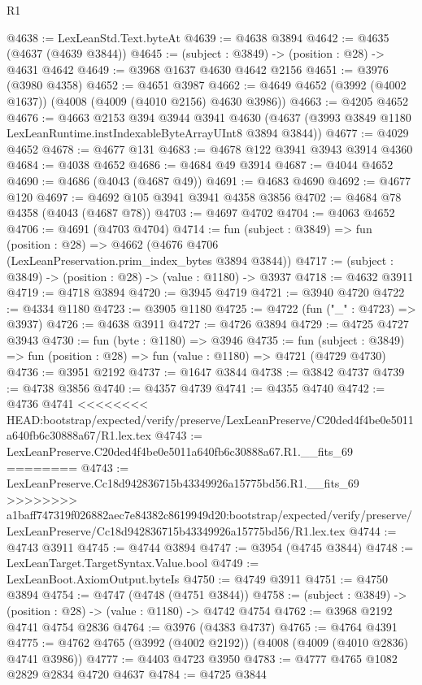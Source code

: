 \begin{lexlean}{R1}
\begin{coremodule}
{{{{{{{{{{{{{{{{{{{{{{{{{{{{{{{{{{{{{{{{{{{{{{{{{{{{{{{{{{{{{{{{{{{{{{{{{{{{{{{{{{{{{{{{{{{{{{{{{{{{{{{{{{{{{{{{{{{{{{{{{{{{{{{{{{{{{{{{{{{{{{{{{{{{{{{{{{{{{{{{{{{{{{{{{{{{{{{{{{{{{{{{{{@4638 := LexLeanStd.Text.byteAt
@4639 := @4638 @3894
@4642 := @4635 (@4637 (@4639 @3844))
@4645 := (subject : @3849) -> (position : @28) -> @4631 @4642
@4649 := @3968 @1637 @4630 @4642 @2156
@4651 := @3976 (@3980 @4358)
@4652 := @4651 @3987
@4662 := @4649 @4652 (@3992 (@4002 @1637)) (@4008 (@4009 (@4010 @2156) @4630 @3986))
@4663 := @4205 @4652
@4676 := @4663
    @2153
    @394
    @3944
    @3941
    @4630
    (@4637 (@3993 @3849 @1180 LexLeanRuntime.instIndexableByteArrayUInt8 @3894 @3844))
@4677 := @4029 @4652
@4678 := @4677 @131
@4683 := @4678 @122 @3941 @3943 @3914 @4360
@4684 := @4038 @4652
@4686 := @4684 @49 @3914
@4687 := @4044 @4652
@4690 := @4686 (@4043 (@4687 @49))
@4691 := @4683 @4690
@4692 := @4677 @120
@4697 := @4692 @105 @3941 @3941 @4358 @3856
@4702 := @4684 @78 @4358 (@4043 (@4687 @78))
@4703 := @4697 @4702
@4704 := @4063 @4652
@4706 := @4691 (@4703 @4704)
@4714 := fun (subject : @3849) =>
  fun (position : @28) => @4662 (@4676 @4706 (LexLeanPreservation.prim_index_bytes @3894 @3844))
@4717 := (subject : @3849) -> (position : @28) -> (value : @1180) -> @3937
@4718 := @4632 @3911
@4719 := @4718 @3894
@4720 := @3945 @4719
@4721 := @3940 @4720
@4722 := @4334 @1180
@4723 := @3905 @1180
@4725 := @4722 (fun ("_" : @4723) => @3937)
@4726 := @4638 @3911
@4727 := @4726 @3894
@4729 := @4725 @4727 @3943
@4730 := fun (byte : @1180) => @3946
@4735 := fun (subject : @3849) => fun (position : @28) => fun (value : @1180) => @4721 (@4729 @4730)
@4736 := @3951 @2192
@4737 := @1647 @3844
@4738 := @3842 @4737
@4739 := @4738 @3856
@4740 := @4357 @4739
@4741 := @4355 @4740
@4742 := @4736 @4741
<<<<<<<< HEAD:bootstrap/expected/verify/preserve/LexLeanPreserve/C20ded4f4be0e5011a640fb6c30888a67/R1.lex.tex
@4743 := LexLeanPreserve.C20ded4f4be0e5011a640fb6c30888a67.R1.__fits_69
========
@4743 := LexLeanPreserve.Cc18d942836715b43349926a15775bd56.R1.__fits_69
>>>>>>>> a1baff747319f026882aec7e84382c8619949d20:bootstrap/expected/verify/preserve/LexLeanPreserve/Cc18d942836715b43349926a15775bd56/R1.lex.tex
@4744 := @4743 @3911
@4745 := @4744 @3894
@4747 := @3954 (@4745 @3844)
@4748 := LexLeanTarget.TargetSyntax.Value.bool
@4749 := LexLeanBoot.AxiomOutput.byteIs
@4750 := @4749 @3911
@4751 := @4750 @3894
@4754 := @4747 (@4748 (@4751 @3844))
@4758 := (subject : @3849) -> (position : @28) -> (value : @1180) -> @4742 @4754
@4762 := @3968 @2192 @4741 @4754 @2836
@4764 := @3976 (@4383 @4737)
@4765 := @4764 @4391
@4775 := @4762 @4765 (@3992 (@4002 @2192)) (@4008 (@4009 (@4010 @2836) @4741 @3986))
@4777 := @4403 @4723 @3950
@4783 := @4777 @4765 @1082 @2829 @2834 @4720 @4637
@4784 := @4725 @3844
}}}}}}}}}}}}}}}}}}}}}}}}}}}}}}}}}}}}}}}}}}}}}}}}}}}}}}}}}}}}}}}}}}}}}}}}}}}}}}}}}}}}}}}}}}}}}}}}}}}}}}}}}}}}}}}}}}}}}}}}}}}}}}}}}}}}}}}}}}}}}}}}}}}}}}}}}}}}}}}}}}}}}}}}}}}}}}}}}}}}}}}}}}
\end{coremodule}
\end{lexlean}
